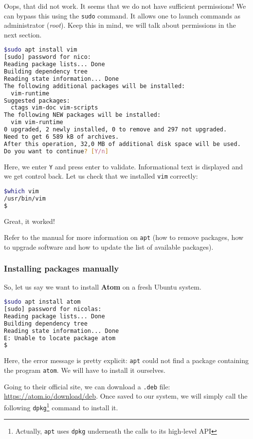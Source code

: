 \documentclass[12pt]{article}
\begin{document}
Oops, that did not work. It seems that we do not have sufficient permissions! We can bypass this using the \texttt{sudo} command. It allows one to launch commands as administrator (\textit{root}). Keep this in mind, we will talk about permissions in the next section.

\begin{lstlisting}[language=bash]
$sudo apt install vim
[sudo] password for nico: 
Reading package lists... Done
Building dependency tree       
Reading state information... Done
The following additional packages will be installed:
  vim-runtime
Suggested packages:
  ctags vim-doc vim-scripts
The following NEW packages will be installed:
  vim vim-runtime
0 upgraded, 2 newly installed, 0 to remove and 297 not upgraded.
Need to get 6 589 kB of archives.
After this operation, 32,0 MB of additional disk space will be used.
Do you want to continue? [Y/n]
\end{lstlisting}

Here, we enter \texttt{Y} and press enter to validate. Informational text is displayed and we get control back. Let us check that we installed \texttt{vim} correctly:

\begin{lstlisting}[language=bash]
$which vim
/usr/bin/vim
$
\end{lstlisting}

Great, it worked!

Refer to the manual for more information on \texttt{apt} (how to remove packages, how to upgrade software and how to update the list of available packages).

\subsubsection{Installing packages manually}

So, let us say we want to install \textbf{Atom} on a fresh Ubuntu system.

\begin{lstlisting}[language=bash]
$sudo apt install atom
[sudo] password for nicolas: 
Reading package lists... Done
Building dependency tree       
Reading state information... Done
E: Unable to locate package atom
$
\end{lstlisting}

Here, the error message is pretty explicit: \texttt{apt} could not find a package containing the program \texttt{atom}. We will have to install it ourselves.

Going to their official site, we can download a \texttt{.deb} file: \url{https://atom.io/download/deb}.
Once saved to our system, we will simply call the following \texttt{dpkg}\footnote{Actually, \texttt{apt} uses \texttt{dpkg} underneath the calls to its high-level API} command to install it.
\end{document}

